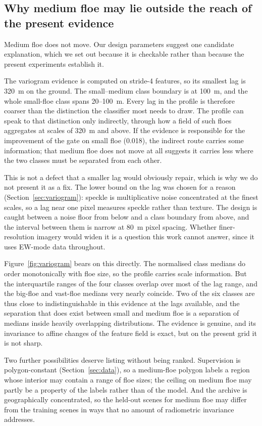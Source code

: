 \documentclass[preprint,12pt,authoryear]{elsarticle}
\begin{document}
\subsection{Why medium floe may lie outside the reach of the present evidence}

Medium floe does not move. Our design parameters suggest one candidate
explanation, which we set out because it is checkable rather than because the
present experiments establish it.

The variogram evidence is computed on stride-4 features, so its smallest lag is
320~m on the ground. The small--medium class boundary is at 100~m, and the whole
small-floe class spans 20--100~m. Every lag in the profile is therefore coarser
than the distinction the classifier most needs to draw. The profile can speak to
that distinction only indirectly, through how a field of such floes aggregates
at scales of 320~m and above. If the evidence is responsible for the
improvement of the gate on small floe (0.018), the indirect route carries some
information; that medium floe does not move at all suggests it carries less
where the two classes must be separated from each other.

This is not a defect that a smaller lag would obviously repair, which is why we
do not present it as a fix. The lower bound on the lag was chosen for a reason
(Section~\ref{sec:variogram}): speckle is multiplicative noise concentrated at
the finest scales, so a lag near one pixel measures speckle rather than texture.
The design is caught between a noise floor from below and a class boundary from
above, and the interval between them is narrow at 80~m pixel spacing. Whether
finer-resolution imagery would widen it is a question this work cannot answer,
since it uses EW-mode data throughout.

Figure~\ref{fig:variogram} bears on this directly. The normalised class medians
do order monotonically with floe size, so the profile carries scale information.
But the interquartile ranges of the four classes overlap over most of the lag
range, and the big-floe and vast-floe medians very nearly coincide. Two of the
six classes are thus close to indistinguishable in this evidence at the lags
available, and the separation that does exist between small and medium floe is a
separation of medians inside heavily overlapping distributions. The evidence is
genuine, and its invariance to affine changes of the feature field is exact,
but on the present grid it is not sharp.

Two further possibilities deserve listing without being ranked. Supervision is
polygon-constant (Section~\ref{sec:data}), so a medium-floe polygon labels a
region whose interior may contain a range of floe sizes; the ceiling on medium
floe may partly be a property of the labels rather than of the model. And the
archive is geographically concentrated, so the held-out scenes for medium floe
may differ from the training scenes in ways that no amount of radiometric
invariance addresses.
\end{document}
